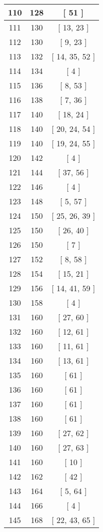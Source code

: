 \begin{center}
\begin{longtable}[H]{|| c c c ||}
\hline
110 & 128 & [ 51 ] \\ 
\hline
111 & 130 & [ 13, 23 ] \\ 
\hline
112 & 130 & [ 9, 23 ] \\ 
\hline
113 & 132 & [ 14, 35, 52 ] \\ 
\hline
114 & 134 & [ 4 ] \\ 
\hline
115 & 136 & [ 8, 53 ] \\ 
\hline
116 & 138 & [ 7, 36 ] \\ 
\hline
117 & 140 & [ 18, 24 ] \\ 
\hline
118 & 140 & [ 20, 24, 54 ] \\ 
\hline
119 & 140 & [ 19, 24, 55 ] \\ 
\hline
120 & 142 & [ 4 ] \\ 
\hline
121 & 144 & [ 37, 56 ] \\ 
\hline
122 & 146 & [ 4 ] \\ 
\hline
123 & 148 & [ 5, 57 ] \\ 
\hline
124 & 150 & [ 25, 26, 39 ] \\ 
\hline
125 & 150 & [ 26, 40 ] \\ 
\hline
126 & 150 & [ 7 ] \\ 
\hline
127 & 152 & [ 8, 58 ] \\ 
\hline
128 & 154 & [ 15, 21 ] \\ 
\hline
129 & 156 & [ 14, 41, 59 ] \\ 
\hline
130 & 158 & [ 4 ] \\ 
\hline
131 & 160 & [ 27, 60 ] \\ 
\hline
132 & 160 & [ 12, 61 ] \\ 
\hline
133 & 160 & [ 11, 61 ] \\ 
\hline
134 & 160 & [ 13, 61 ] \\ 
\hline
135 & 160 & [ 61 ] \\ 
\hline
136 & 160 & [ 61 ] \\ 
\hline
137 & 160 & [ 61 ] \\ 
\hline
138 & 160 & [ 61 ] \\ 
\hline
139 & 160 & [ 27, 62 ] \\ 
\hline
140 & 160 & [ 27, 63 ] \\ 
\hline
141 & 160 & [ 10 ] \\ 
\hline
142 & 162 & [ 42 ] \\ 
\hline
143 & 164 & [ 5, 64 ] \\ 
\hline
144 & 166 & [ 4 ] \\ 
\hline
145 & 168 & [ 22, 43, 65 ] \\ 

\end{longtable}
\end{center}
